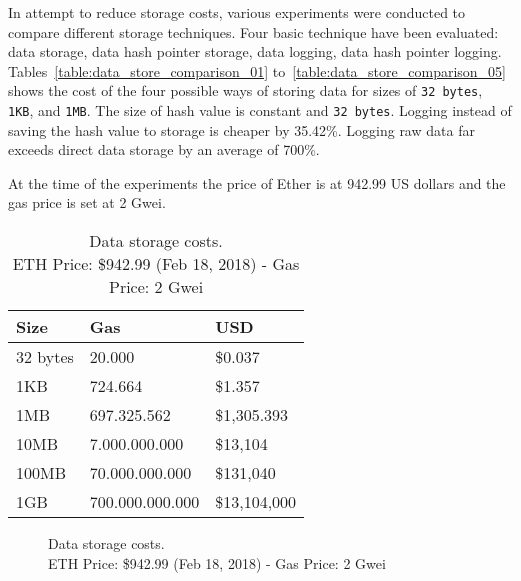 In attempt to reduce storage costs, various experiments were conducted to compare different storage techniques. Four basic technique have been evaluated: data storage, data hash pointer storage, data logging, data hash pointer logging. Tables~\ref{table:data_store_comparison_01} to~\ref{table:data_store_comparison_05} shows the cost of the four possible ways of storing data for sizes of \verb|32 bytes|, \verb|1KB|, and \verb|1MB|. The size of hash value is constant and \verb|32 bytes|. Logging instead of saving the hash value to storage is cheaper by 35.42\%. Logging raw data far exceeds direct data storage by an average of 700\%.

At the time of the experiments the price of Ether is at 942.99 US dollars and the gas price is set at 2 Gwei.

\begin{table}[!htb]
\centering
\caption[Data storage costs]{Data storage costs.\\ ETH Price: \$942.99 (Feb 18, 2018) - Gas Price: 2 Gwei}
\begin{tabular}{|l|l|l|}
\hline
 Size & Gas  & USD \\ \hline
 32 bytes & 20.000  & \$0.037 \\ \hline
 1KB & 724.664  & \$1.357 \\ \hline
 1MB & 697.325.562  & \$1,305.393 \\ \hline
 10MB & 7.000.000.000  & \$13,104 \\ \hline
 100MB & 70.000.000.000  & \$131,040 \\ \hline
 1GB & 700.000.000.000  & \$13,104,000 \\ \hline
\end{tabular}
\captionsetup{format=hang, justification=centering}
\label{table:bytes_usd_cost}
\end{table}

\begin{figure}[!htb]
  \centering
  \captionsetup{format=hang, justification=centering}
  \caption[Data storage costs]{Data storage costs.\\ ETH Price: \$942.99 (Feb 18, 2018) - Gas Price: 2 Gwei}
  \label{fig:bytes_usd_cost}
\end{figure}

